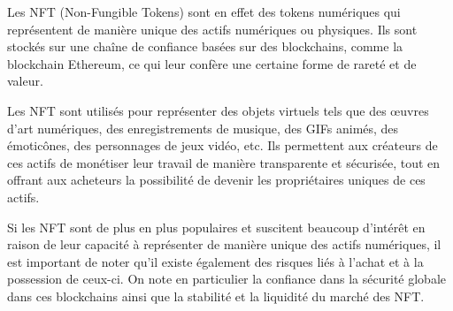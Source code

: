 Les NFT (Non-Fungible Tokens) sont en effet des tokens numériques qui représentent de manière unique des actifs numériques ou physiques. Ils sont stockés sur une chaîne de confiance basées sur des blockchains, comme la blockchain Ethereum, ce qui leur confère une certaine forme de rareté et de valeur.

Les NFT sont  utilisés pour représenter des objets virtuels tels que des œuvres d'art numériques, des enregistrements de musique, des GIFs animés, des émoticônes, des personnages de jeux vidéo, etc. Ils permettent aux créateurs de ces actifs de monétiser leur travail de manière transparente et sécurisée, tout en offrant aux acheteurs la possibilité de devenir les propriétaires uniques de ces actifs.

Si les NFT sont de plus en plus populaires et suscitent beaucoup d'intérêt en raison de leur capacité à représenter de manière unique des actifs numériques, il est important de noter qu'il existe également des risques liés à l'achat et à la possession de ceux-ci. On note en particulier la confiance dans la sécurité globale dans ces blockchains ainsi que la stabilité et la liquidité du marché des NFT.




